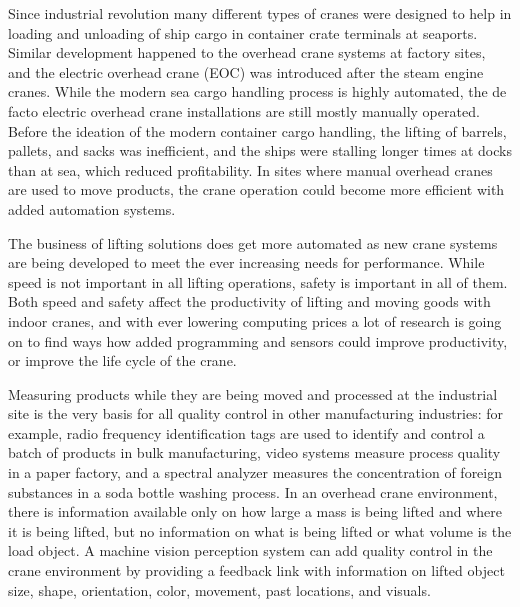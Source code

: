 \documentclass[12pt,a4paper,oneside,pdftex]{report}
\begin{document}
Since industrial revolution many different types of cranes were designed to help in loading and unloading of ship cargo in container crate terminals at seaports. Similar development happened to the overhead crane systems at factory sites, and the electric overhead crane (EOC) was introduced after the steam engine cranes. While the modern sea cargo handling process is highly automated, the de facto electric overhead crane installations are still mostly manually operated. Before the ideation of the modern container cargo handling, the lifting of barrels, pallets, and sacks was inefficient, and the ships were stalling longer times at docks than at sea, which reduced profitability\citep{Zrni04}. In sites where manual overhead cranes are used to move products, the crane operation could become more efficient with added automation systems.

The business of lifting solutions does get more automated as new crane systems are being developed to meet the ever increasing needs for performance. While speed is not important in all lifting operations, safety is important in all of them. Both speed and safety affect the productivity of lifting and moving goods with indoor cranes, and with ever lowering computing prices a lot of research is going on to find ways how added programming and sensors could improve productivity, or improve the life cycle of the crane.

Measuring products while they are being moved and processed at the industrial site is the very basis for all quality control in other manufacturing industries: for example, radio frequency identification tags are used to identify and control a batch of products in bulk manufacturing, video systems measure process quality in a paper factory, and a spectral analyzer measures the concentration of foreign substances in a soda bottle washing process. In an overhead crane environment, there is information available only on how large a mass is being lifted and where it is being lifted, but no information on what is being lifted or what volume is the load object. A machine vision perception system can add quality control in the crane environment by providing a feedback link with information on lifted object size, shape, orientation, color, movement, past locations, and visuals.

\end{document}
